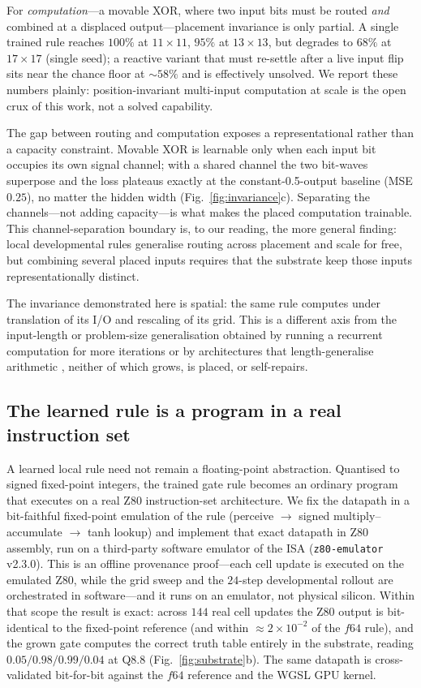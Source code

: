 For \emph{computation}---a movable XOR, where two input bits must be routed \emph{and} combined at a displaced output---placement invariance is only partial. A single trained rule reaches $100\%$ at $11\times11$, $95\%$ at $13\times13$, but degrades to $68\%$ at $17\times17$ (single seed); a reactive variant that must re-settle after a live input flip sits near the chance floor at $\sim\!58\%$ and is effectively unsolved. We report these numbers plainly: position-invariant multi-input computation at scale is the open crux of this work, not a solved capability.

The gap between routing and computation exposes a representational rather than a capacity constraint. Movable XOR is learnable only when each input bit occupies its own signal channel; with a shared channel the two bit-waves superpose and the loss plateaus exactly at the constant-0.5-output baseline (MSE $0.25$), no matter the hidden width (Fig.~\ref{fig:invariance}c). Separating the channels---not adding capacity---is what makes the placed computation trainable. This channel-separation boundary is, to our reading, the more general finding: local developmental rules generalise routing across placement and scale for free, but combining several placed inputs requires that the substrate keep those inputs representationally distinct.

The invariance demonstrated here is spatial: the same rule computes under translation of its I/O and rescaling of its grid. This is a different axis from the input-length or problem-size generalisation obtained by running a recurrent computation for more iterations \citep{schwarzschild2021easytohard} or by architectures that length-generalise arithmetic \citep{kaiser2016neuralgpu}, neither of which grows, is placed, or self-repairs.

\subsection{The learned rule is a program in a real instruction set}
\label{sec:substrate}

A learned local rule need not remain a floating-point abstraction. Quantised to signed fixed-point integers, the trained gate rule becomes an ordinary program that executes on a real Z80 instruction-set architecture. We fix the datapath in a bit-faithful fixed-point emulation of the rule (perceive $\rightarrow$ signed multiply--accumulate $\rightarrow$ tanh lookup) and implement that exact datapath in Z80 assembly, run on a third-party software emulator of the ISA (\texttt{z80-emulator} v2.3.0). This is an offline provenance proof---each cell update is executed on the emulated Z80, while the grid sweep and the $24$-step developmental rollout are orchestrated in software---and it runs on an emulator, not physical silicon. Within that scope the result is exact: across $144$ real cell updates the Z80 output is bit-identical to the fixed-point reference (and within $\approx\!2\times10^{-2}$ of the $f64$ rule), and the grown gate computes the correct truth table entirely in the substrate, reading $0.05/0.98/0.99/0.04$ at Q8.8 (Fig.~\ref{fig:substrate}b). The same datapath is cross-validated bit-for-bit against the $f64$ reference and the WGSL GPU kernel.

